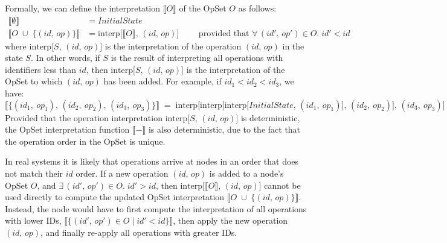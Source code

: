 Formally, we can define the interpretation $\llbracket O \rrbracket$ of the OpSet $O$ as follows:
\begin{align*}
    \big\llbracket \emptyset \big\rrbracket &= \mathit{InitialState} \\
    \big\llbracket O \;\cup\; \{(\mathit{id},\, \mathit{op})\} \big\rrbracket &=
    \mathrm{interp}\big[\llbracket O \rrbracket,\, (\mathit{id},\, \mathit{op})\big]
    \qquad\text{ provided that } \forall\,(\mathit{id}',\, \mathit{op}') \in O.\; \mathit{id}' < \mathit{id}
\end{align*}
where $\mathrm{interp}\big[S,\, (\mathit{id},\, \mathit{op})\big]$ is the interpretation of the operation $(\mathit{id},\, \mathit{op})$ in the state $S$.
In other words, if $S$ is the result of interpreting all operations with identifiers less than $\mathit{id}$, then
$\mathrm{interp}\big[S,\, (\mathit{id},\, \mathit{op})\big]$ is the interpretation of the OpSet to which $(\mathit{id},\, \mathit{op})$ has been added.
For example, if $\mathit{id}_1 < \mathit{id}_2 < \mathit{id}_3$, we have:
\[ \big\llbracket \{(\mathit{id}_1,\ \mathit{op}_1),\,
    (\mathit{id}_2,\ \mathit{op}_2),\,
    (\mathit{id}_3,\ \mathit{op}_3)\} \big\rrbracket \;=\;
    \mathrm{interp}\big[\mathrm{interp}\big[\mathrm{interp}\big[\mathit{InitialState},\,
    (\mathit{id}_1,\ \mathit{op}_1)\big],\,
    (\mathit{id}_2,\ \mathit{op}_2)\big],\,
    (\mathit{id}_3,\ \mathit{op}_3)\big] \]
Provided that the operation interpretation $\mathrm{interp}\big[S,\, (\mathit{id},\, \mathit{op})\big]$ is deterministic, the OpSet interpretation function $\llbracket-\rrbracket$ is also deterministic, due to the fact that the operation order in the OpSet is unique.

In real systems it is likely that operations arrive at nodes in an order that does not match their $\mathit{id}$ order.
If a new operation $(\mathit{id},\, \mathit{op})$ is added to a node's OpSet $O$, and $\exists\,(\mathit{id}',\, \mathit{op}') \in O.\; \mathit{id}' > \mathit{id}$,
then $\mathrm{interp}\big[\llbracket O \rrbracket,\, (\mathit{id},\, \mathit{op})\big]$ cannot be used directly to compute the updated OpSet interpretation
$\big\llbracket O \;\cup\; \{(\mathit{id},\, \mathit{op})\} \big\rrbracket$.
Instead, the node would have to first compute the interpretation of all operations with lower IDs,
$\big\llbracket \{(\mathit{id}',\, \mathit{op}') \in O \mid \mathit{id}' < \mathit{id}\} \big\rrbracket$,
then apply the new operation $(\mathit{id},\, \mathit{op})$, and finally re-apply all operations with greater IDs.

